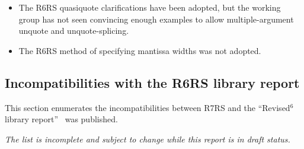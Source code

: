 \begin{itemize}
\item The R6RS {\cf quasiquote} clarifications have been adopted, but the working group has not seen
convincing enough examples to allow multiple-argument {\cf unquote} and
{\cf unquote-splicing}.

\item The R6RS method of specifying mantissa widths was not adopted.

\end{itemize}

\subsection*{Incompatibilities with the R6RS library report}

This section enumerates the incompatibilities between R7RS and
the ``Revised$^6$ library report''~\cite{R6RS-lib} was published.

{\em The list is incomplete and subject to change while this report is in draft status.}

